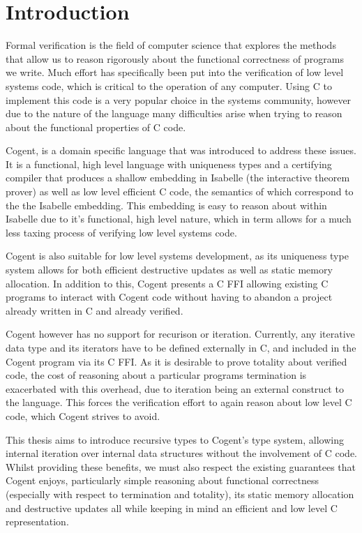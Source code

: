 \chapter{Introduction}\label{ch:intro}


Formal verification is the field of computer science that explores the methods that allow us to
  reason rigorously about the functional correctness of programs we write. 
Much effort has specifically been put into the verification of low level systems code,
  which is critical to the operation of any computer.
Using C to implement this code is a very popular choice in the systems community,
  however due to the nature of the language many difficulties arise when trying to
  reason about the functional properties of C code.

Cogent\cite{ICFPCogent}, is a domain specific language that was introduced to address these issues.
It is a functional, high level language with uniqueness types and a certifying compiler
  that produces a shallow embedding in Isabelle (the interactive theorem prover) as well as low level efficient C code,
  the semantics of which correspond to the the Isabelle embedding.
This embedding is easy to reason about within Isabelle due to it's functional,
  high level nature, which in term allows for a much less taxing process of verifying low level systems code. 

Cogent is also suitable for low level systems development,
  as its uniqueness type system allows for both efficient destructive updates as well as static memory allocation.
In addition to this, Cogent presents a C FFI allowing existing C programs to interact with Cogent code without having to
  abandon a project already written in C and already verified.

Cogent however has no support for recurison or iteration. 
Currently, any iterative data type and its iterators have to be defined externally in C,
  and included in the Cogent program via its C FFI.
As it is desirable to prove totality about verified code,
  the cost of reasoning about a particular programs termination is exacerbated with this overhead,
  due to iteration being an external construct to the language.
This forces the verification effort to again reason about low level C code, which Cogent strives to avoid.

This thesis aims to introduce recursive types to Cogent's type system, allowing internal iteration over
  internal data structures without the involvement of C code.
Whilst providing these benefits, we must also respect the existing guarantees that Cogent enjoys,
  particularly simple reasoning about functional correctness (especially with respect to termination and totality),
  its static memory allocation and destructive updates all while keeping in mind
  an efficient and low level C representation.